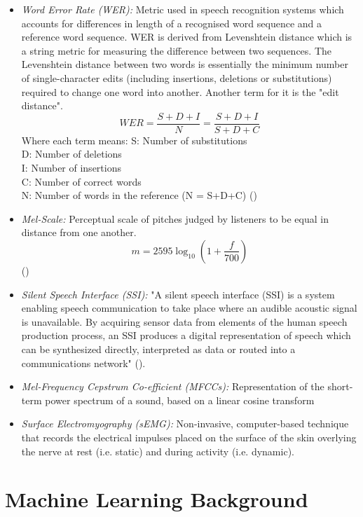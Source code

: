 \begin{itemize}
  \item \emph{Word Error Rate (WER):}
  Metric used in speech recognition systems which accounts for differences in length of
  a recognised word sequence and a reference word sequence. WER is derived from
  Levenshtein distance  which is a string metric for measuring the difference between two
  sequences. The Levenshtein distance between two words is essentially the minimum number of
  single-character edits (including insertions, deletions or substitutions) required to
  change one word into another. Another term for it is the "edit distance".
  \[
    WER
    = \dfrac{S + D + I}{N}
    = \dfrac{S + D + I}{S + D + C}
  \]
  Where each term means:
  S: Number of substitutions\\
  D: Number of deletions\\
  I: Number of insertions\\
  C: Number of correct words\\
  N: Number of words in the reference (N = S+D+C)
  (\cite{1966SPhD...10..707L})
  \item \emph{Mel-Scale:}
  Perceptual scale of pitches judged by listeners to be equal in distance from one another.
  \[ m = 2595 \log_{10} \left(1 + \dfrac{f}{700}\right) \]
  (\cite{mel_scale_formula})
  \item \emph{Silent Speech Interface (SSI):}
  "A silent speech interface (SSI) is a system enabling speech communication to take
  place where an audible acoustic signal is unavailable. By acquiring sensor data from
  elements of the human speech production process, an SSI produces a digital representation
  of speech which can be synthesized directly, interpreted as data or routed into a communications
  network" (\cite{ssi_definition}).
  \item \emph{Mel-Frequency Cepstrum Co-efficient (MFCCs):}
  Representation of the short-term power spectrum of a sound, based on a linear cosine transform
  \item \emph{Surface Electromyography (sEMG):}
  Non-invasive, computer-based technique that records the electrical impulses placed on the surface
  of the skin overlying the nerve at rest (i.e. static) and during activity (i.e. dynamic).
\end{itemize}

\section{Machine Learning Background}

